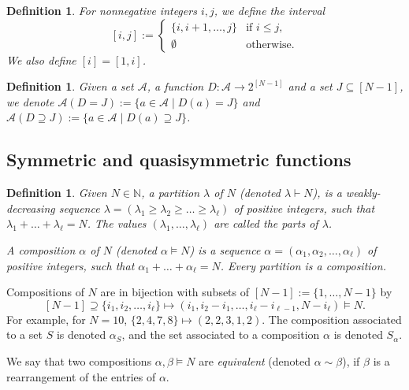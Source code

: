 \documentclass[11pt]{article}
\newtheorem{definition}[theo]{Definition}
\theoremstyle{definition}
\numberwithin{equation}{section}
\newcommand{\NN}{\mathbb{N}}
\newcommand{\A}{\mathcal{A}}
\begin{document}
\begin{definition}
    For nonnegative integers $i,j$, we define the \emph{interval}
    \[
        [i,j] :=
        \begin{cases}
            \{i,i+1,\dots,j\} & \text{if $i \le j$,}\\
            \emptyset & \text{otherwise.}
        \end{cases}
    \]
    We also define $[i] = [1,i]$.
\end{definition}

\begin{definition}
\label{def:elements with given stat}
    Given a set $\A$, a function $D:\A \to 2^{[N-1]}$ and a set $J \subseteq [N-1]$, we denote $\A(D=J) := \{a \in \A \mid D(a) = J\}$ and $\A(D \supseteq J) := \{a \in \A \mid D(a) \supseteq J\}$.
\end{definition}

\subsection{Symmetric and quasisymmetric functions}
\label{subsec:definitions symmetric functions}

\begin{definition}
    Given $N \in \NN$, a \emph{partition} $\lambda$ of $N$ (denoted $\lambda \vdash N$), is a weakly-decreasing sequence $\lambda = (\lambda_1 \ge \lambda_2 \ge \dots \ge \lambda_\ell)$ of positive integers, such that $\lambda_1 + \dots + \lambda_\ell = N$. The values $(\lambda_1,\dots,\lambda_\ell)$ are called the \emph{parts} of $\lambda$.
    
    A \emph{composition} $\alpha$ of $N$ (denoted $\alpha \vDash N$) is a sequence $\alpha = (\alpha_1, \alpha_2, \dots, \alpha_\ell )$ of positive integers, such that $\alpha_1 + \dots + \alpha_\ell = N$. Every partition is a composition.
\end{definition}

Compositions of $N$ are in bijection with subsets of $[N-1] := \{1, \dots, N-1\}$ by 
\[
    [N-1] \supseteq \{i_1, i_2, \dots, i_\ell \} \mapsto (i_1, i_2 - i_1, \dots, i_\ell - i_{\ell-1}, N - i_\ell) \vDash N.
\]
For example, for $N = 10$, $\{2, 4, 7, 8\} \mapsto (2, 2, 3, 1, 2)$. The composition associated to a set $S$ is denoted $\alpha_S$, and the set associated to a composition $\alpha$ is denoted $S_\alpha$.

We say that two compositions $\alpha, \beta \vDash N$ are \emph{equivalent} (denoted $\alpha \sim \beta$), if $\beta$ is a rearrangement of the entries of $\alpha$.
\end{document}
